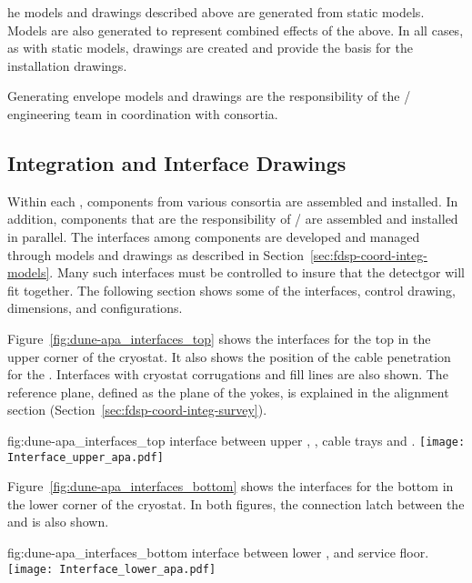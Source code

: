 he models and drawings described above are generated from static
models. Models are also generated to represent combined effects of the
above. In all cases, as with static models, \twod drawings are created
and provide the basis for the installation drawings.


Generating envelope models and drawings are the responsibility of the
/ engineering team in coordination with consortia.


\subsection{Integration and Interface Drawings}
\label{sec:fdsp-coord-integ-drawings}

Within each , components from various consortia are
assembled and installed. In addition, components that are the
responsibility of / are assembled and installed in
parallel. The interfaces among components are developed and managed
through models and drawings as described in
Section~\ref{sec:fdsp-coord-integ-models}. Many such interfaces must
be controlled to insure that the detectgor will fit together. The
following section shows some of the interfaces, control drawing,
dimensions, and configurations.


Figure~\ref{fig:dune-apa_interfaces_top} shows the interfaces for the
top  in the upper corner of the cryostat. It also shows the position
of the cable penetration for the . Interfaces with cryostat
corrugations and  fill lines are also shown. The reference plane,
defined as the plane of the  yokes, is explained in the
alignment section (Section~\ref{sec:fdsp-coord-integ-survey}).
\begin{dunefigure}{fig:dune-apa_interfaces_top}
  { interface between upper , , cable
    trays and .}
  \texttt{[image: Interface\_upper\_apa.pdf]}
\end{dunefigure}


Figure~\ref{fig:dune-apa_interfaces_bottom} shows the interfaces for
the bottom  in the lower corner of the cryostat. In both figures,
the connection latch between the  and  is also
shown.
\begin{dunefigure}{fig:dune-apa_interfaces_bottom}
  { interface between lower ,  and
    service floor.}
  \texttt{[image: Interface\_lower\_apa.pdf]}
\end{dunefigure}

